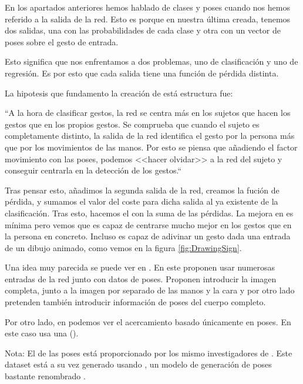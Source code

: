 En los apartados anteriores hemos hablado de clases y poses cuando nos hemos referido a la salida de la red. Esto es porque en nuestra última  creada, tenemos dos salidas, una con las probabilidades de cada clase y otra con un vector de poses sobre el gesto de entrada.

Esto significa que nos enfrentamos a dos problemas, uno de clasificación y uno de regresión. Es por esto que cada salida tiene una función de pérdida distinta.

La hipotesis que fundamento la creación de está estructura fue:

``A la hora de clasificar gestos, la red  se centra más en los sujetos que hacen los gestos que en los propios gestos. Se comprueba que cuando el sujeto es completamente distinto, la salida de la red identifica el gesto por la persona más que por los movimientos de las manos. Por esto se piensa que añadiendo el factor movimiento con las poses, podemos <<hacer olvidar>> a la red del sujeto y conseguir centrarla en la detección de los gestos.``

Tras pensar esto, añadimos la segunda salida de la red, creamos la fución de pérdida, y sumamos el valor del coste para dicha salida al ya existente de la clasificación. Tras esto, hacemos el  con la suma de las pérdidas. La mejora en  es mínima pero vemos que es capaz de centrarse mucho mejor en los gestos que en la persona en concreto. Incluso es capaz de adivinar un gesto dada una entrada de un dibujo animado, como vemos en la figura \ref{fig:DrawingSign}.


Una idea muy parecida se puede ver en . En este  proponen usar numerosas entradas de la red junto con datos de poses. Proponen introducir la imagen completa, junto a la imagen por separado de las manos y la cara y por otro lado pretenden también introducir información de poses del cuerpo completo.

Por otro lado, en  podemos ver el acercamiento basado únicamente en poses. En este caso usa una  ().

Nota: El  de las poses está proporcionado por los mismo investigadores de  . Este dataset está a su vez generado usando , un modelo de generación de poses bastante renombrado .

